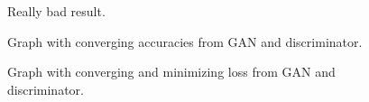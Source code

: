 \documentclass[12pt, a4paper]{article}
\begin{document}
\begin{figure}
        \caption{Really bad result.}
        \label{fig:worstImage}
\end{figure}
\begin{figure}
    \caption{Graph with converging accuracies from GAN and discriminator.}
    \label{fig:goodGraphAcc}
\end{figure}
\begin{figure}
    \caption{Graph with converging and minimizing loss from GAN and discriminator.}
    \label{fig:goodGraphLoss}
\end{figure}
\end{document}

